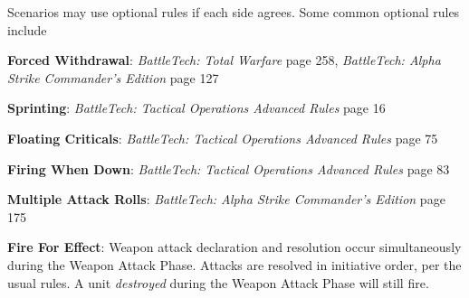 Scenarios may use optional rules if each side agrees.
Some common optional rules include

\begin{description}

\item {\bfseries Forced Withdrawal}: \emph{BattleTech: Total Warfare} page 258, \emph{BattleTech: Alpha Strike Commander's Edition} page 127

\item {\bfseries Sprinting}: \emph{BattleTech: Tactical Operations Advanced Rules} page 16

\item {\bfseries Floating Criticals}: \emph{BattleTech: Tactical Operations Advanced Rules} page 75

\item {\bfseries Firing When Down}: \emph{BattleTech: Tactical Operations Advanced Rules} page 83

\item {\bfseries Multiple Attack Rolls}: \emph{BattleTech: Alpha Strike Commander's Edition} page 175

\item {\bfseries Fire For Effect}: Weapon attack declaration and resolution occur simultaneously during the Weapon Attack Phase.
Attacks are resolved in initiative order, per the usual rules.
A unit \emph{destroyed} during the Weapon Attack Phase will still fire.

\end{description}
